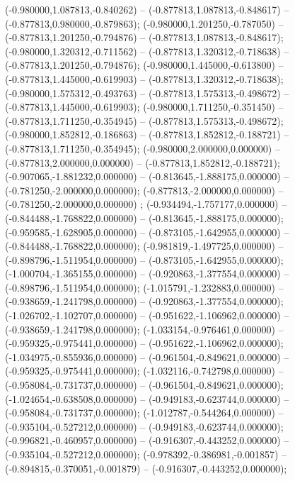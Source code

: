  (-0.980000,1.087813,-0.840262) -- (-0.877813,1.087813,-0.848617) -- (-0.877813,0.980000,-0.879863);
 (-0.980000,1.201250,-0.787050) -- (-0.877813,1.201250,-0.794876) -- (-0.877813,1.087813,-0.848617);
 (-0.980000,1.320312,-0.711562) -- (-0.877813,1.320312,-0.718638) -- (-0.877813,1.201250,-0.794876);
 (-0.980000,1.445000,-0.613800) -- (-0.877813,1.445000,-0.619903) -- (-0.877813,1.320312,-0.718638);
 (-0.980000,1.575312,-0.493763) -- (-0.877813,1.575313,-0.498672) -- (-0.877813,1.445000,-0.619903);
 (-0.980000,1.711250,-0.351450) -- (-0.877813,1.711250,-0.354945) -- (-0.877813,1.575313,-0.498672);
 (-0.980000,1.852812,-0.186863) -- (-0.877813,1.852812,-0.188721) -- (-0.877813,1.711250,-0.354945);
 (-0.980000,2.000000,0.000000) -- (-0.877813,2.000000,0.000000) -- (-0.877813,1.852812,-0.188721);
 (-0.907065,-1.881232,0.000000) -- (-0.813645,-1.888175,0.000000) -- (-0.781250,-2.000000,0.000000);
 (-0.877813,-2.000000,0.000000) -- (-0.781250,-2.000000,0.000000) ;
 (-0.934494,-1.757177,0.000000) -- (-0.844488,-1.768822,0.000000) -- (-0.813645,-1.888175,0.000000);
 (-0.959585,-1.628905,0.000000) -- (-0.873105,-1.642955,0.000000) -- (-0.844488,-1.768822,0.000000);
 (-0.981819,-1.497725,0.000000) -- (-0.898796,-1.511954,0.000000) -- (-0.873105,-1.642955,0.000000);
 (-1.000704,-1.365155,0.000000) -- (-0.920863,-1.377554,0.000000) -- (-0.898796,-1.511954,0.000000);
 (-1.015791,-1.232883,0.000000) -- (-0.938659,-1.241798,0.000000) -- (-0.920863,-1.377554,0.000000);
 (-1.026702,-1.102707,0.000000) -- (-0.951622,-1.106962,0.000000) -- (-0.938659,-1.241798,0.000000);
 (-1.033154,-0.976461,0.000000) -- (-0.959325,-0.975441,0.000000) -- (-0.951622,-1.106962,0.000000);
 (-1.034975,-0.855936,0.000000) -- (-0.961504,-0.849621,0.000000) -- (-0.959325,-0.975441,0.000000);
 (-1.032116,-0.742798,0.000000) -- (-0.958084,-0.731737,0.000000) -- (-0.961504,-0.849621,0.000000);
 (-1.024654,-0.638508,0.000000) -- (-0.949183,-0.623744,0.000000) -- (-0.958084,-0.731737,0.000000);
 (-1.012787,-0.544264,0.000000) -- (-0.935104,-0.527212,0.000000) -- (-0.949183,-0.623744,0.000000);
 (-0.996821,-0.460957,0.000000) -- (-0.916307,-0.443252,0.000000) -- (-0.935104,-0.527212,0.000000);
 (-0.978392,-0.386981,-0.001857) -- (-0.894815,-0.370051,-0.001879) -- (-0.916307,-0.443252,0.000000);
